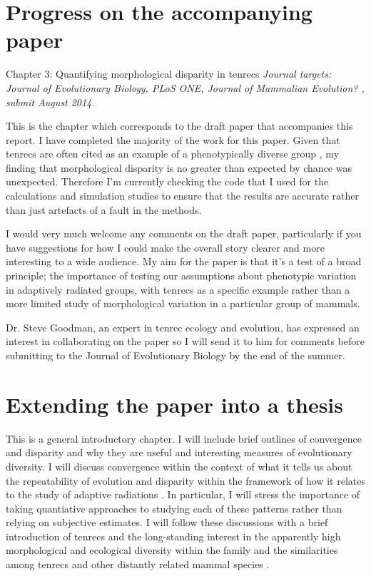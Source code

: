 \documentclass[12pt,a4paper]{article}
\begin{document}
\section{Progress on the accompanying paper}

Chapter 3: Quantifying morphological disparity in tenrecs
\textit{Journal targets: Journal of Evolutionary Biology, PLoS ONE, Journal of Mammalian Evolution? , submit August 2014.} 


This is the chapter which corresponds to the draft paper that accompanies this report. I have completed the majority of the work for this paper. Given that tenrecs are often cited as an example of a phenotypically diverse group \citep[e.g.][]{Olson2013}, my finding that morphological disparity is no greater than expected by chance was unexpected. Therefore I'm currently checking the code that I used for the calculations and simulation studies to ensure that the results are accurate rather than just artefacts of a fault in the methods. 

I would very much welcome any comments on the draft paper, particularly if you have suggestions for how I could make the overall story clearer and more interesting to a wide audience. My aim for the paper is that it's a test of a broad principle; the importance of testing our assumptions about phenotypic variation in adaptively radiated groups, with tenrecs as a specific example rather than a more limited study of morphological variation in a particular group of mammals.

Dr. Steve Goodman, an expert in tenrec ecology and evolution, has expressed an interest in collaborating on the paper so I will send it to him for comments before submitting to the Journal of Evolutionary Biology by the end of the summer.


\section{Extending the paper into a thesis}



This is a general introductory chapter. I will include brief outlines of convergence and disparity and why they are useful and interesting measures of evolutionary diversity. I will discuss convergence within the context of what it tells us about the repeatability of evolution \citep[e.g][]{Blount2008} and disparity within the framework of how it relates to the study of adaptive radiations \citep{Losos2010a}. In particular, I will stress the importance of taking quantiative approaches to studying each of these patterns rather than relying on subjective estimates. I will follow these discussions with a brief introduction of tenrecs and the long-standing interest in the apparently high morphological and ecological diversity within the family and the similarities among tenrecs and other distantly related mammal species \citep[e.g.][]{Eisenberg1969, Soarimalala2011, Olson2013}. 
\end{document}
